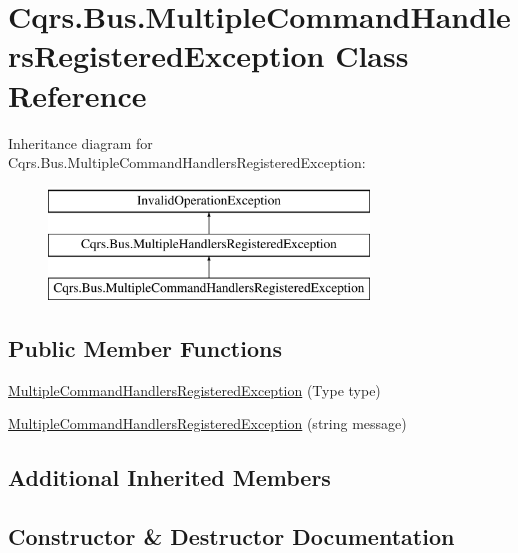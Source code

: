 \hypertarget{classCqrs_1_1Bus_1_1MultipleCommandHandlersRegisteredException}{}\section{Cqrs.\+Bus.\+Multiple\+Command\+Handlers\+Registered\+Exception Class Reference}
\label{classCqrs_1_1Bus_1_1MultipleCommandHandlersRegisteredException}
Inheritance diagram for Cqrs.\+Bus.\+Multiple\+Command\+Handlers\+Registered\+Exception\+:\begin{figure}[H]
\begin{center}
\leavevmode
\includegraphics[height=3.000000cm]{classCqrs_1_1Bus_1_1MultipleCommandHandlersRegisteredException}
\end{center}
\end{figure}
\subsection*{Public Member Functions}
\begin{DoxyCompactItemize}
\item 
\hyperlink{classCqrs_1_1Bus_1_1MultipleCommandHandlersRegisteredException_ab96d6d42b3697336f1a8c545128d263f_ab96d6d42b3697336f1a8c545128d263f}{Multiple\+Command\+Handlers\+Registered\+Exception} (Type type)
\item 
\hyperlink{classCqrs_1_1Bus_1_1MultipleCommandHandlersRegisteredException_ab3bf3a31e91d75d78788cd414d054e56_ab3bf3a31e91d75d78788cd414d054e56}{Multiple\+Command\+Handlers\+Registered\+Exception} (string message)
\end{DoxyCompactItemize}
\subsection*{Additional Inherited Members}


\subsection{Constructor \& Destructor Documentation}
\mbox{\label{classCqrs_1_1Bus_1_1MultipleCommandHandlersRegisteredException_ab96d6d42b3697336f1a8c545128d263f_ab96d6d42b3697336f1a8c545128d263f}} 
